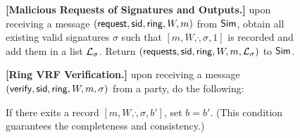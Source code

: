\begin{figure}
\begin{tcolorbox}[left=2pt,right=2pt]
{			%
			
			\textbf{[Malicious Requests of  Signatures and Outputs.]} upon receiving a message $ (\mathsf{request}, \textsf{sid}, \mathsf{ring}, W, m) $ from $ \mathsf{Sim} $, obtain all existing valid signatures $ \sigma $ such that $ [m,W,\ring,\sigma, 1] $ is recorded and add them in a list $ {\mathcal{L}}_{\sigma} $. 	Return $ (\mathsf{requests}, \textsf{sid}, \mathsf{ring}, W,m, {\mathcal{L}}_{\sigma})  $ to $ \mathsf{Sim} $.
			
			
			\textbf{[Ring VRF Verification.]} upon receiving a message $(\mathsf{verify}, \textsf{sid}, \mathsf{ring},W, m, \sigma)$ from a party, do the following: 
			\begin{list}{\hspace*{1pt} C}{\setlength\leftmargin{0.15in}}
				\item If there exits a record $ [m,W,\ring,\sigma, b'] $, set $ b = b' $. (This condition guarantees the completeness and consistency.)
				

\end{list}}
\end{tcolorbox}
\end{figure}
